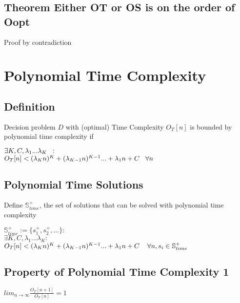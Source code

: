 \documentclass[11pt]{article}
\begin{document}
\subsection{Theorem Either OT or OS is on the order of Oopt}
Proof by contradiction








\newpage
\section{Polynomial Time Complexity}

\subsection{Definition}
Decision problem $D$ with (optimal) Time Complexity $O_T[n]$ is bounded by polynomial time complexity if
\begin{center}
$\exists K,C,\lambda_1...\lambda_K \hspace{2mm} :$
\\ \vspace{2mm}
$O_T[n] < (\lambda_K n)^K + (\lambda_{K-1} n)^{K-1}... + \lambda_1 n + C \hspace{3mm} \forall n$
\end{center}








\subsection{Polynomial Time Solutions}
Define $\mathbb{S}^+_{time}$, the set of solutions that can be solved with polynomial time complexity
\begin{center}
$
\mathbb{S}^+_{time} := \{s^+_1,s^+_2,...\} : 
$
\\
$
\exists K,C,\lambda_1...\lambda_K : 
$
\\
$
O_T[n] < (\lambda_K n)^K + (\lambda_{K-1} n)^{K-1}... + \lambda_1 n + C \hspace{4mm} \forall n, s_i \in \mathbb{S}^+_{time}
$
\end{center}








\subsection{Property of Polynomial Time Complexity 1}
\begin{center}
$
lim_{n \rightarrow \infty} \frac{O_T[n+1]}{O_T[n]} = 1
$
\end{center}
\end{document}
